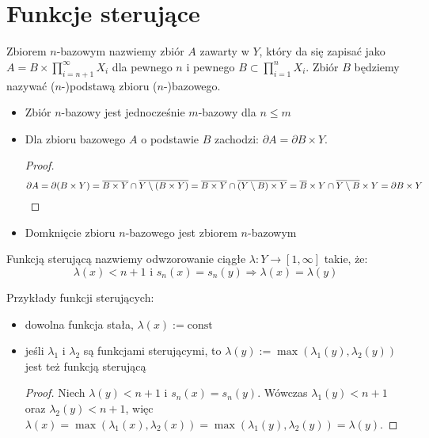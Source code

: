 \section{Funkcje sterujące}


\begin{df}
Zbiorem $n$-bazowym nazwiemy zbiór $A$ zawarty w $Y$, który da się zapisać jako $A = B \times \prod_{i=n+1}^\infty X_i$ dla pewnego $n$ i pewnego $B \subset \prod_{i=1}^n X_i$. Zbiór $B$ będziemy nazywać ($n$-)podstawą zbioru ($n$-)bazowego.
\end{df}


\begin{note} \mbox{} %
\begin{itemize}
  \item Zbiór $n$-bazowy jest jednocześnie $m$-bazowy dla $n \leq m$
  \item Dla zbioru bazowego $A$ o podstawie $B$ zachodzi: $\partial A = \partial B \times Y$.
  \begin{proof}
    \[\partial A = \partial(B \times Y) = \overline{B \times Y} \cap \overline{Y \setminus (B \times Y)} = \overline{B \times Y} \cap \overline{(Y \setminus B) \times Y} = \overline{B} \times Y \cap \overline{Y \setminus B} \times Y = \partial{B} \times Y\]
  \end{proof}
  \item Domknięcie zbioru $n$-bazowego jest zbiorem $n$-bazowym
\end{itemize}
\end{note}


\begin{df}
Funkcją sterującą nazwiemy odwzorowanie ciągłe $\lambda: Y \rightarrow [1,\infty]$ takie, że:
\[\lambda(x) < n+1 \mbox{ i } s_n(x) = s_n(y) \Rightarrow \lambda(x) = \lambda(y)\]
\end{df}

\begin{note}
Przykłady funkcji sterujących:
  \begin{itemize}
    \item dowolna funkcja stała, $\lambda(x) := \mbox{const}$
    \item jeśli $\lambda_1$ i $\lambda_2$ są funkcjami sterującymi, to $\lambda(y) := \max(\lambda_1(y), \lambda_2(y))$ jest też funkcją sterującą
  \begin{proof}
    Niech $\lambda(y) < n+1$ i $s_n(x) = s_n(y)$. Wówczas $\lambda_1(y) < n+1$ oraz $\lambda_2(y) < n+1$, więc $\lambda(x) = \max(\lambda_1(x), \lambda_2(x)) = \max(\lambda_1(y), \lambda_2(y)) = \lambda(y)$.
  \end{proof}
  \end{itemize}
\end{note}


